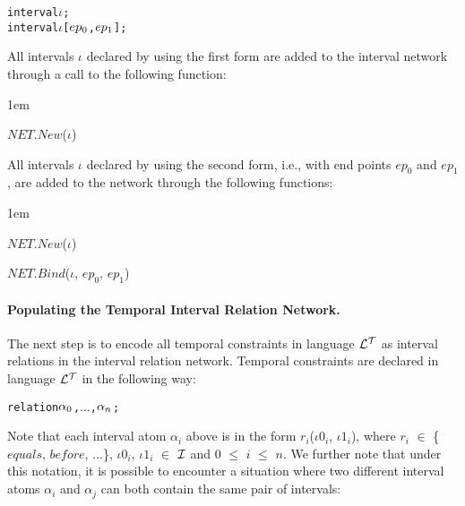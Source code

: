 \documentclass[11pt]{report}
\newenvironment{vverbatim}
{
  \begin{alltt}
}
{
    \vspace{-\baselineskip}
  \end{alltt}
}
\newenvironment{vquote}
{
  \begin{list}{}{\leftmargin 1em}\item[]
}
{
  \end{list}
}
\begin{document}
            \begin{vverbatim}
  interval \(\iota\);
  interval \(\iota\) [\(ep\sb{0}\), \(ep\sb{1}\)];
            \end{vverbatim}

            All intervals $\iota$ declared by using the first form are added
            to the interval network through a call to the following function:

            \begin{vquote}
              $NET.New$($\iota$)
            \end{vquote}

            All intervals $\iota$ declared by using the second form, i.e.,
            with end points $ep_0$ and $ep_1$, are added to the network
            through the following functions:

            \begin{vquote}
              $NET.New$($\iota$)

              $NET.Bind$($\iota$, $ep_0$, $ep_1$)
            \end{vquote}

          \paragraph
            {\bf Populating the Temporal Interval Relation Network.}

            The next step is to encode all temporal constraints in
            language ${\cal L^T}$ as interval relations in the interval
            relation network. Temporal constraints are declared in language
            ${\cal L^T}$ in the following way:

            \begin{vverbatim}
  relation \(\alpha\sb{0}\), \(\ldots\), \(\alpha\sb{n}\);
            \end{vverbatim}

            Note that each interval atom ${\alpha}_i$ above is in the form
            $r_i$(${\iota}0_i$, ${\iota}1_i$), where $r_i$ $\in$ \{$equals$,
            $before$, $\ldots$\}, ${\iota}0_i$, ${\iota}1_i$ $\in$
            ${\cal I}$ and $0$ $\leq$ $i$ $\leq$ $n$. We further note that
            under this notation, it is possible to encounter a situation
            where two different interval atoms ${\alpha}_i$ and ${\alpha}_j$
            can both contain the same pair of intervals:
\end{document}
